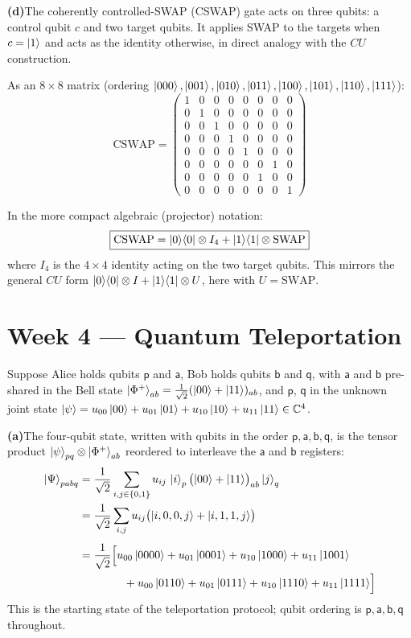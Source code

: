 \documentclass[12pt,a4paper]{article}
\begin{document}
\medskip
\noindent\textbf{(d)}\enspace The coherently controlled-SWAP (CSWAP) gate acts on three qubits: a control qubit $c$ and two target qubits.
It applies SWAP to the targets when $c=\ket{1}$ and acts as the identity otherwise, in direct analogy with the $CU$ construction.

As an $8\times8$ matrix (ordering $\ket{000},\ket{001},\ket{010},\ket{011},\ket{100},\ket{101},\ket{110},\ket{111}$):
\[
  \mathrm{CSWAP} =
  \begin{pmatrix}
    1&0&0&0&0&0&0&0\\
    0&1&0&0&0&0&0&0\\
    0&0&1&0&0&0&0&0\\
    0&0&0&1&0&0&0&0\\
    0&0&0&0&1&0&0&0\\
    0&0&0&0&0&0&1&0\\
    0&0&0&0&0&1&0&0\\
    0&0&0&0&0&0&0&1
  \end{pmatrix}
\]

In the more compact algebraic (projector) notation:
\[
  \boxed{\mathrm{CSWAP} = \ket{0}\!\bra{0}\otimes I_4 + \ket{1}\!\bra{1}\otimes \mathrm{SWAP}}
\]
where $I_4$ is the $4\times4$ identity acting on the two target qubits.
This mirrors the general $CU$ form $\ket{0}\!\bra{0}\otimes I+\ket{1}\!\bra{1}\otimes U$, here with $U=\mathrm{SWAP}$.

\section*{Week 4 --- Quantum Teleportation}

Suppose Alice holds qubits $\mathsf{p}$ and $\mathsf{a}$, Bob holds qubits $\mathsf{b}$ and $\mathsf{q}$,
with $\mathsf{a}$ and $\mathsf{b}$ pre-shared in the Bell state
$\ket{\Phi^+}_{ab}=\tfrac{1}{\sqrt{2}}(\ket{00}+\ket{11})_{ab}$,
and $\mathsf{p}$, $\mathsf{q}$ in the unknown joint state
$\ket{\psi}=u_{00}\ket{00}+u_{01}\ket{01}+u_{10}\ket{10}+u_{11}\ket{11}\in\mathbb{C}^4$.

\medskip
\noindent\textbf{(a)}\enspace The four-qubit state, written with qubits in the order $\mathsf{p,a,b,q}$, is the tensor product
$\ket{\psi}_{pq}\otimes\ket{\Phi^+}_{ab}$ reordered to interleave the $\mathsf{a}$ and $\mathsf{b}$ registers:
\begin{align*}
\ket{\Psi}_{pabq}
  &= \frac{1}{\sqrt{2}}\sum_{i,j\in\{0,1\}}u_{ij}\,\ket{i}_{p}\bigl(\ket{00}+\ket{11}\bigr)_{ab}\ket{j}_{q} \\
  &= \frac{1}{\sqrt{2}}\sum_{i,j}u_{ij}\bigl(\ket{i,0,0,j}+\ket{i,1,1,j}\bigr) \\[4pt]
  &= \frac{1}{\sqrt{2}}\Bigl[
      u_{00}\ket{0000}+u_{01}\ket{0001}+u_{10}\ket{1000}+u_{11}\ket{1001} \\
  &\qquad\qquad
     +u_{00}\ket{0110}+u_{01}\ket{0111}+u_{10}\ket{1110}+u_{11}\ket{1111}
     \Bigr]
\end{align*}
This is the starting state of the teleportation protocol; qubit ordering is $\mathsf{p,a,b,q}$ throughout.
\end{document}
